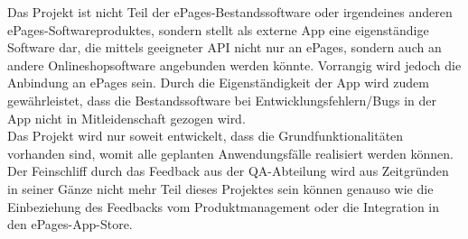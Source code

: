 Das Projekt ist nicht Teil der ePages-Bestandssoftware oder irgendeines anderen ePages-Softwareproduktes, sondern stellt als externe App eine eigenständige Software dar, die mittels geeigneter API nicht nur an ePages, sondern auch an andere Onlineshopsoftware angebunden werden könnte. Vorrangig wird jedoch die Anbindung an ePages sein. Durch die Eigenständigkeit der App wird zudem gewährleistet, dass die Bestandssoftware bei Entwicklungsfehlern/Bugs in der App nicht in Mitleidenschaft gezogen wird. \\
Das Projekt wird nur soweit entwickelt, dass die Grundfunktionalitäten vorhanden sind, womit alle geplanten Anwendungsfälle realisiert werden können. Der Feinschliff durch das Feedback aus der QA-Abteilung wird aus Zeitgründen in seiner Gänze nicht mehr Teil dieses Projektes sein können genauso wie die Einbeziehung des Feedbacks vom Produktmanagement oder die Integration in den ePages-App-Store.

